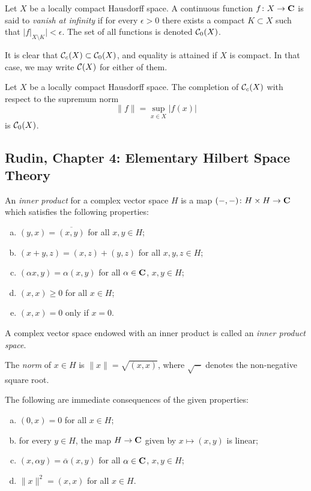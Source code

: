 \begin{definition}
  Let $X$ be a locally compact Hausdorff space. A continuous function $f \colon X \rightarrow \mathbf{C}$ is said to \emph{vanish at infinity} if for every $\epsilon > 0$ there exists a compact $K \subset X$ such that $|f|_{X \setminus K}| < \epsilon$. The set of all functions is denoted $\mathcal{C}_0(X)$.
\end{definition}

\begin{remark}
  It is clear that $\mathcal{C}_c(X) \subset \mathcal{C}_0(X)$, and equality is attained if $X$ is compact. In that case, we may write $\mathcal{C}(X)$ for either of them.
\end{remark}

\begin{theorem}
  Let $X$ be a locally compact Hausdorff space. The completion of $\mathcal{C}_c(X)$ with respect to the supremum norm
  \[
  \|f\| = \sup_{x \in X} |f(x)|
  \]
  is $\mathcal{C}_0(X)$.
\end{theorem}

\subsection{Rudin, Chapter 4: Elementary Hilbert Space Theory}

\begin{definition}
  An \emph{inner product} for a complex vector space $H$ is a map $(-,-) \colon H \times H \rightarrow \mathbf{C}$ which satisfies the following properties:
  \begin{enumerate}[(a)]
  \item $(y,x) = \overline{(x,y)}$ for all $x,y \in H$;
  \item $(x+y,z) = (x,z) + (y,z)$ for all $x,y,z \in H$;
  \item $(\alpha x,y) = \alpha(x,y)$ for all $\alpha \in \mathbf{C}$, $x,y \in H$;
  \item $(x,x) \geq 0$ for all $x \in H$;
  \item $(x,x) = 0$ only if $x = 0$.
  \end{enumerate}
  A complex vector space endowed with an inner product is called an \emph{inner product space}.
\end{definition}

\begin{definition}
  The \emph{norm} of $x \in H$ is $\|x\| = \sqrt{(x,x)}$, where $\sqrt{-}$ denotes the non-negative square root.
\end{definition}

The following are immediate consequences of the given properties:
\begin{enumerate}[(a)]
\item $(0,x) = 0$ for all $x \in H$;
\item for every $y \in H$, the map $H \rightarrow \mathbf{C}$ given by $x \mapsto (x,y)$ is linear;
\item $(x,\alpha y) = \overline{\alpha}(x,y)$ for all $\alpha \in \mathbf{C}$, $x,y \in H$;
\item $\|x\|^2 = (x,x)$ for all $x \in H$.
\end{enumerate}

